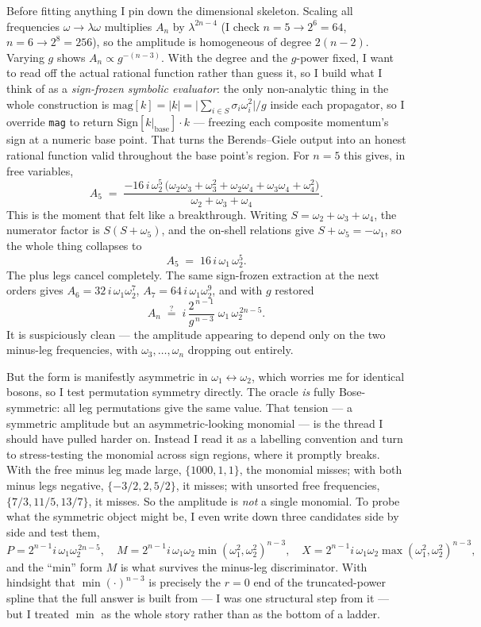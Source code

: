 \documentclass{article}
\begin{document}
Before fitting anything I pin down the dimensional skeleton. Scaling all
frequencies $\omega\to\lambda\omega$ multiplies $A_n$ by $\lambda^{2n-4}$ (I check
$n=5\to2^6=64$, $n=6\to2^8=256$), so the amplitude is homogeneous of degree
$2(n-2)$. Varying $g$ shows $A_n\propto g^{-(n-3)}$. With the degree and the
$g$-power fixed, I want to read off the actual rational function rather than
guess it, so I build what I think of as a \emph{sign-frozen symbolic evaluator}:
the only non-analytic thing in the whole construction is
$\mathrm{mag}[k]=|k|=\big|\sum_{i\in S}\sigma_i\omega_i^2\big|/g$ inside each
propagator, so I override \texttt{mag} to return $\mathrm{Sign}[k|_{\text{base}}]\cdot k$
--- freezing each composite momentum's sign at a numeric base point. That turns
the Berends--Giele output into an honest rational function valid throughout the
base point's region. For $n=5$ this gives, in free variables,
\[
A_5 \;=\; \frac{-16\,i\,\omega_2^{5}\,
\big(\omega_2\omega_3+\omega_3^{2}+\omega_2\omega_4+\omega_3\omega_4+\omega_4^{2}\big)}
{\omega_2+\omega_3+\omega_4}.
\]
This is the moment that felt like a breakthrough. Writing $S=\omega_2+\omega_3+\omega_4$,
the numerator factor is $S(S+\omega_5)$, and the on-shell relations give
$S+\omega_5=-\omega_1$, so the whole thing collapses to
\[
A_5 \;=\; 16\,i\,\omega_1\,\omega_2^{5}.
\]
The plus legs cancel completely. The same sign-frozen extraction at the next
orders gives $A_6=32\,i\,\omega_1\omega_2^{7}$, $A_7=64\,i\,\omega_1\omega_2^{9}$,
and with $g$ restored
\[
A_n \;\stackrel{?}{=}\; i\,\frac{2^{\,n-1}}{g^{\,n-3}}\;\omega_1\,\omega_2^{\,2n-5}.
\]
It is suspiciously clean --- the amplitude appearing to depend only on the two
minus-leg frequencies, with $\omega_3,\dots,\omega_n$ dropping out entirely.

But the form is manifestly asymmetric in $\omega_1\leftrightarrow\omega_2$, which
worries me for identical bosons, so I test permutation symmetry directly. The
oracle \emph{is} fully Bose-symmetric: all leg permutations give the same value.
That tension --- a symmetric amplitude but an asymmetric-looking monomial --- is
the thread I should have pulled harder on. Instead I read it as a labelling
convention and turn to stress-testing the monomial across sign regions, where it
promptly breaks. With the free minus leg made large, $\{1000,1,1\}$, the
monomial misses; with both minus legs negative, $\{-3/2,2,5/2\}$, it misses; with
unsorted free frequencies, $\{7/3,11/5,13/7\}$, it misses. So the amplitude is
\emph{not} a single monomial. To probe what the symmetric object might be, I even
write down three candidates side by side and test them,
\[
P=2^{n-1}i\,\omega_1\omega_2^{\,2n-5},\quad
M=2^{n-1}i\,\omega_1\omega_2\min(\omega_1^2,\omega_2^2)^{n-3},\quad
X=2^{n-1}i\,\omega_1\omega_2\max(\omega_1^2,\omega_2^2)^{n-3},
\]
and the ``min'' form $M$ is what survives the minus-leg discriminator. With
hindsight that $\min(\cdot)^{n-3}$ is precisely the $r=0$ end of the
truncated-power spline that the full answer is built from --- I was one structural
step from it --- but I treated $\min$ as the whole story rather than as the bottom
of a ladder.
\end{document}
